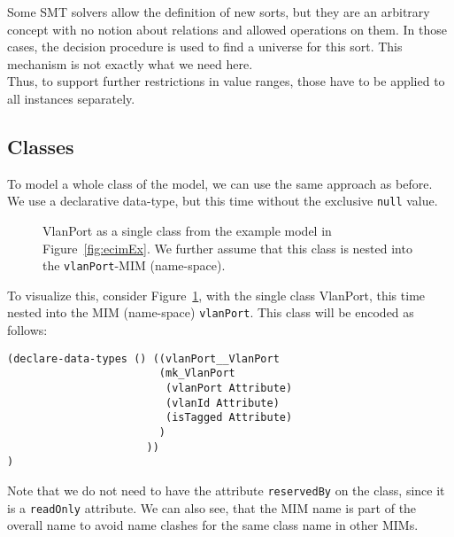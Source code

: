 Some SMT solvers allow the definition of new sorts, but they are an arbitrary concept with no notion about relations and allowed operations on them. In those cases, the decision procedure is used to find a universe for this sort. This mechanism is not exactly what we need here. \\

Thus, to support further restrictions in value ranges, those have to be applied to all instances separately.


\subsection*{Classes}
To model a whole class of the model, we can use the same approach as before. We use a declarative data-type, but this time without the exclusive \verb|null| value. 

\begin{figure}[tb]
\centering
{}
\caption[\textsf{VlanPort} class]{\textsf{VlanPort} as a single class from the example model in Figure~\ref{fig:ecimEx}. We further assume that this class is nested into the \texttt{vlanPort}-MIM (name-space).}
\label{fig:singleClass}
\end{figure}

To visualize this, consider Figure~\ref{fig:singleClass}, with the single class \textsf{VlanPort}, this time nested into the MIM (name-space) \verb|vlanPort|. This class will be encoded as follows:
\begin{verbatim}
(declare-data-types () ((vlanPort__VlanPort 
                        (mk_VlanPort 
                         (vlanPort Attribute)
                         (vlanId Attribute)
                         (isTagged Attribute)
	                    )
	                  ))
)
\end{verbatim}
Note that we do not need to have the attribute \verb|reservedBy| on the class, since it is a \verb|readOnly| attribute. We can also see, that the MIM name is part of the overall name to avoid name clashes for the same class name in other MIMs.\\

